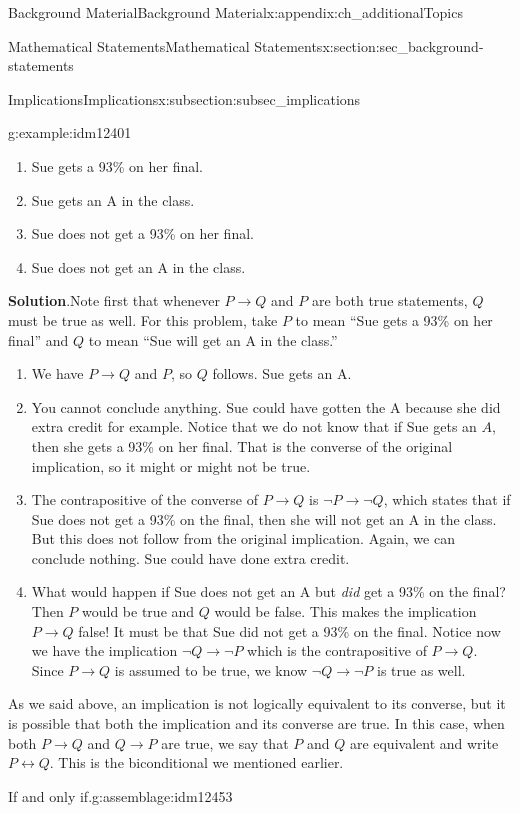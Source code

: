\documentclass[oneside,10pt,]{book}
\numberwithin{equation}{chapter}
\def\iff{\leftrightarrow}
\def\imp{\rightarrow}
\begin{document}
\begin{appendixptx}{Background Material}{}{Background Material}{}{}{x:appendix:ch_additionalTopics}
\begin{sectionptx}{Mathematical Statements}{}{Mathematical Statements}{}{}{x:section:sec_background-statements}
\begin{subsectionptx}{Implications}{}{Implications}{}{}{x:subsection:subsec_implications}
\begin{example}{}{g:example:idm12401}
\begin{enumerate}
\item{}Sue gets a 93\% on her final.%
\item{}Sue gets an A in the class.%
\item{}Sue does not get a 93\% on her final.%
\item{}Sue does not get an A in the class.%
\end{enumerate}
%
\par\smallskip%
\noindent\textbf{Solution}.\hypertarget{g:solution:idm12414}{}\quad{}Note first that whenever \(P \imp Q\) and \(P\) are both true statements, \(Q\) must be true as well. For this problem, take \(P\) to mean ``Sue gets a 93\% on her final'' and \(Q\) to mean ``Sue will get an A in the class.''%
\par
%
\begin{enumerate}
\item{}We have \(P \imp Q\) and \(P\), so \(Q\) follows. Sue gets an A.%
\item{}You cannot conclude anything. Sue could have gotten the A because she did extra credit for example. Notice that we do not know that if Sue gets an \(A\), then she gets a 93\% on her final. That is the converse of the original implication, so it might or might not be true.%
\item{}The contrapositive of the converse of \(P \imp Q\) is \(\neg P \imp \neg Q\), which states that if Sue does not get a 93\% on the final, then she will not get an A in the class. But this does not follow from the original implication. Again, we can conclude nothing. Sue could have done extra credit.%
\item{}What would happen if Sue does not get an A but \emph{did} get a 93\% on the final? Then \(P\) would be true and \(Q\) would be false. This makes the implication \(P \imp Q\) false! It must be that Sue did not get a 93\% on the final. Notice now we have the implication \(\neg Q \imp \neg P\) which is the contrapositive of \(P \imp Q\). Since \(P \imp Q\) is assumed to be true, we know \(\neg Q \imp \neg P\) is true as well.%
\end{enumerate}
%
\end{example}
As we said above, an implication is not logically equivalent to its converse, but it is possible that both the implication and its converse are true. In this case, when both \(P \imp Q\) and \(Q \imp P\) are true, we say that \(P\) and \(Q\) are equivalent and write \(P \iff Q\). This is the biconditional we mentioned earlier.%
\begin{assemblage}{If and only if.}{g:assemblage:idm12453}%

\end{assemblage}
\end{subsectionptx}
\end{sectionptx}
\end{appendixptx}
\end{document}

